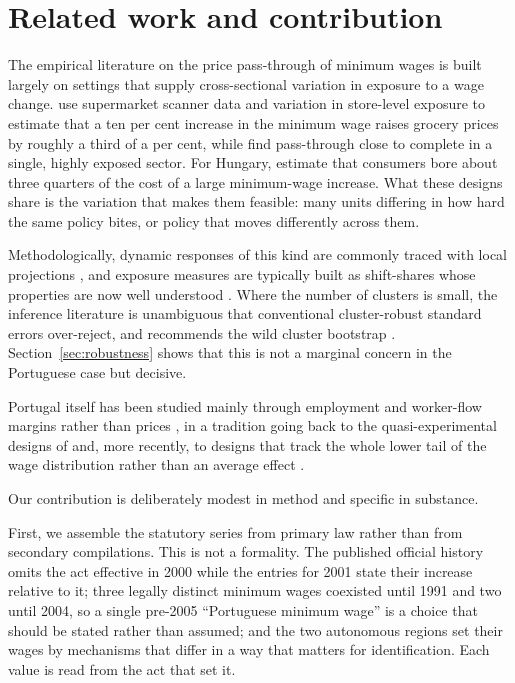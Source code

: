 \section{Related work and contribution}
\label{sec:literature}

The empirical literature on the price pass-through of minimum wages is built
largely on settings that supply cross-sectional variation in exposure to a wage
change. \citet{renkin2022passthrough} use supermarket scanner data and variation
in store-level exposure to estimate that a ten per cent increase in the minimum
wage raises grocery prices by roughly a third of a per cent, while
\citet{ashenfelter2022mcdonalds} find pass-through close to complete in a single,
highly exposed sector. For Hungary, \citet{harasztosi2019whopays} estimate that
consumers bore about three quarters of the cost of a large minimum-wage
increase. What these designs share is the variation that makes them feasible:
many units differing in how hard the same policy bites, or policy that moves
differently across them.

Methodologically, dynamic responses of this kind are commonly traced with local
projections \citep{jorda2005projections}, and exposure measures are typically
built as shift-shares whose properties are now well understood
\citep{goldsmithpinkham2020bartik}. Where the number of clusters is small, the
inference literature is unambiguous that conventional cluster-robust standard
errors over-reject, and recommends the wild cluster bootstrap
\citep{cameron2008bootstrap}. Section~\ref{sec:robustness} shows that this is not
a marginal concern in the Portuguese case but decisive.

Portugal itself has been studied mainly through employment and worker-flow
margins rather than prices \citep{portugal2006disentangling}, in a tradition
going back to the quasi-experimental designs of \citet{card1994minimum} and, more
recently, to designs that track the whole lower tail of the wage distribution
rather than an average effect \citep{cengiz2019bunching}.

Our contribution is deliberately modest in method and specific in substance.

First, we assemble the statutory series from primary law rather than from
secondary compilations. This is not a formality. The published official history
omits the act effective in 2000 while the entries for 2001 state their increase
relative to it; three legally distinct minimum wages coexisted until 1991 and two
until 2004, so a single pre-2005 ``Portuguese minimum wage'' is a choice that
should be stated rather than assumed; and the two autonomous regions set their
wages by mechanisms that differ in a way that matters for identification. Each
value is read from the act that set it.

